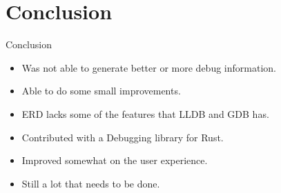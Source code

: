 \section{Conclusion}

\begin{frame}{Conclusion}
    \begin{itemize}
	\item Was not able to generate better or more debug information.
        \item Able to do some small improvements.
        \item ERD lacks some of the features that LLDB and GDB has.
        \item Contributed with a Debugging library for Rust.
        \item Improved somewhat on the user experience.
        \item Still a lot that needs to be done.
    \end{itemize}
\end{frame}




